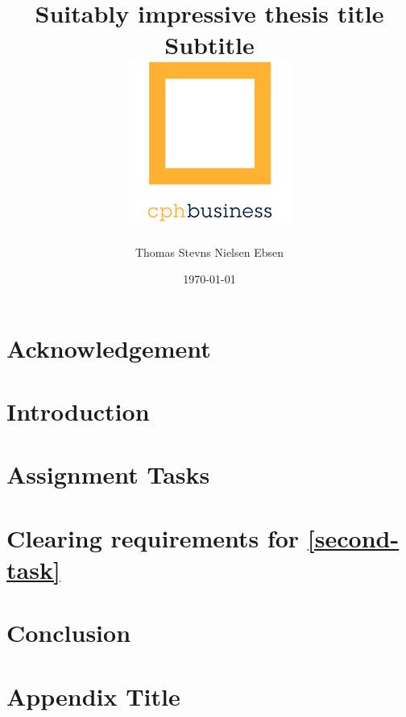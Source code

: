 \documentclass[12pt]{report}
\title{
    {Suitably impressive thesis title}\\
    {\large Subtitle}\\
    {\includegraphics{cphbusiness-small.png}}
}
\author{Thomas Stevns Nielsen Ebsen}
\date{\today}
\begin{document}




\chapter*{Acknowledgement}


\tableofcontents
\listoffigures
\listoftables

\chapter{Introduction}


\chapter{Assignment Tasks}



\chapter{Clearing requirements for \ref{second-task}}









\chapter{Conclusion}


\appendix
\chapter{Appendix Title}


\printbibliography

\listoftodos
\end{document}
